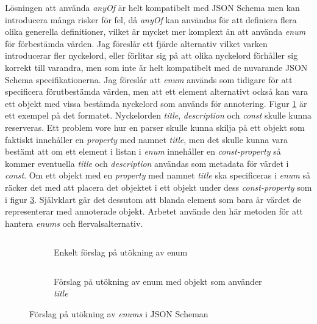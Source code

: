 Lösningen att använda \textit{anyOf} är helt kompatibelt med JSON Schema men kan introducera många risker för fel, då \textit{anyOf} kan användas för att definiera flera olika generella definitioner, vilket är mycket mer komplext än att använda \textit{enum} för förbestämda värden. Jag föreslår ett fjärde alternativ vilket varken introducerar fler nyckelord, eller förlitar sig på att olika nyckelord förhåller sig korrekt till varandra, men som inte är helt kompatibelt med de nuvarande JSON Schema specifikationerna. Jag föreslår att \textit{enum} används som tidigare för att specificera förutbestämda värden, men att ett element alternativt också kan vara ett objekt med vissa bestämda nyckelord som används för annotering. Figur \ref{fig:enum-example:const} är ett exempel på det formatet. Nyckelorden \textit{title}, \textit{description} och \textit{const} skulle kunna reserveras. Ett problem vore hur en parser skulle kunna skilja på ett objekt som faktiskt innehåller en \textit{property} med namnet \textit{title}, men det skulle kunna vara bestämt att om ett element i listan i \textit{enum} innehåller en \textit{const-property} så kommer eventuella \textit{title} och \textit{description} användas som metadata för värdet i \textit{const}. Om ett objekt med en \textit{property} med namnet \textit{title} ska specificeras i \textit{enum} så räcker det med att placera det objektet i ett objekt under dess \textit{const-property} som i figur \ref{fig:enum-example:title}. Självklart går det dessutom att blanda element som bara är värdet de representerar med annoterade objekt. Arbetet använde den här metoden för att hantera \textit{enums} och flervalsalternativ.

\begin{figure}
	\begin{subfigure}[t]{0.47\textwidth}
		\inputminted[tabsize=2, frame=single, fontsize=\small, framesep=2mm, breaklines]{json}{code/enum-example/const.json}
		\vspace{-1.2em}
		\caption{Enkelt förslag på utökning av enum}
		\label{fig:enum-example:const}
	\end{subfigure}\hfill
	\begin{subfigure}[t]{0.47\textwidth}
		\inputminted[tabsize=2, frame=single, fontsize=\small, framesep=2mm, breaklines]{json}{code/enum-example/nested.json}
		\vspace{-1.2em}
		\caption{Förslag på utökning av enum med objekt som använder \textit{title}}
		\label{fig:enum-example:title}
	\end{subfigure}
	\caption{Förslag på utökning av \textit{enums} i JSON Scheman}
\end{figure}